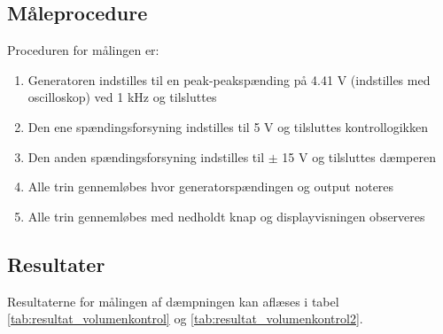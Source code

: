 \subsection*{Måleprocedure}
Proceduren for målingen er:

\begin{enumerate}
\item Generatoren indstilles til en peak-peakspænding på 4.41 V (indstilles med oscilloskop) ved 1 kHz og tilsluttes
\item Den ene spændingsforsyning indstilles til 5 V og tilsluttes kontrollogikken
\item Den anden spændingsforsyning indstilles til $\pm$ 15 V og tilsluttes dæmperen
\item Alle trin gennemløbes hvor generatorspændingen og output noteres
\item Alle trin gennemløbes med nedholdt knap og displayvisningen observeres
\end{enumerate}

\subsection*{Resultater}

Resultaterne for målingen af dæmpningen kan aflæses i tabel \ref{tab:resultat_volumenkontrol} og \ref{tab:resultat_volumenkontrol2}.

